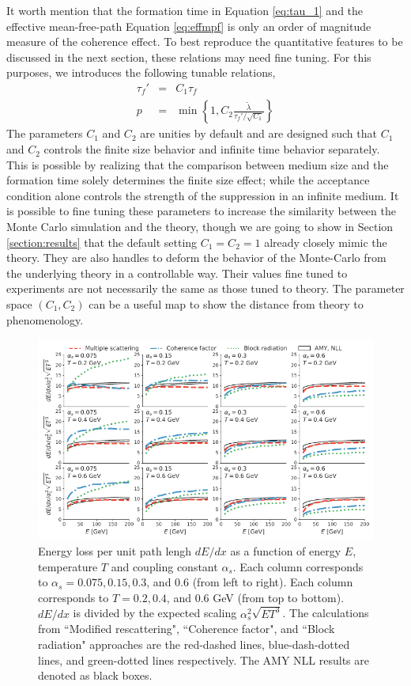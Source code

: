 \documentclass[aps, prc, reprint, amsmath, groupedaddress, nofootinbib]{revtex4-1}
\begin{document}
It worth mention that the formation time in Equation \ref{eq:tau_1} and the effective mean-free-path Equation \ref{eq:effmpf} is only an order of magnitude measure of the coherence effect. 
To best reproduce the quantitative features to be discussed in the next section, these relations may need fine tuning.
For this purposes, we introduces the following tunable relations,
\begin{eqnarray}\label{eq:tune}
\nonumber
\tau_f' &=& C_1 \tau_f \\
p &=& \min\left\{1, C_2\frac{\tilde{\lambda}}{\tau_f'/\sqrt{C_1}}\right\}
\end{eqnarray}
The parameters $C_1$ and $C_2$ are unities by default and are designed such that $C_1$ and $C_2$ controls the finite size behavior and infinite time behavior separately. 
This is possible by realizing that the comparison between medium size and the formation time solely determines the finite size effect; while the acceptance condition alone controls the strength of the suppression in an infinite medium.
It is possible to fine tuning these parameters to increase the similarity between the Monte Carlo simulation and the theory, though we are going to show in Section \ref{section:results} that the default setting $C_1 = C_2 = 1$ already closely mimic the theory.
They are also handles to deform the behavior of the Monte-Carlo from the underlying theory in a controllable way.
Their values fine tuned to experiments are not necessarily the same as those tuned to theory. 
The parameter space $(C_1, C_2)$ can be a useful map to show the distance from theory to phenomenology.

\begin{figure}
\includegraphics[width=\textwidth]{Eloss_infinite.pdf}
\caption{Energy loss per unit path lengh $dE/dx$ as a function of energy $E$, temperature $T$ and coupling constant $\alpha_s$. Each column corresponds to $\alpha_s = 0.075, 0.15, 0.3$, and $0.6$ (from left to right). Each column corresponds to $T = 0.2, 0.4$, and $0.6$ GeV (from top to bottom). $dE/dx$ is divided by the expected scaling $\alpha_s^2 \sqrt{ET^3}$. The calculations from ``Modified rescattering", ``Coherence factor", and ``Block radiation" approaches are the red-dashed lines, blue-dash-dotted lines, and green-dotted lines respectively. The AMY NLL results are denoted as black boxes.}
\label{fig:eloss-inf}
\end{figure}
\end{document}
